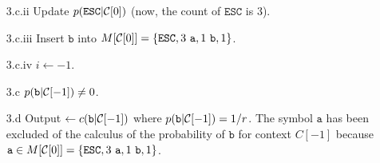 \begin{itemize}
\begin{enumerate}
  \item [3.c.ii] Update $p(\mathtt{ESC}|{\cal C}[0])$ (now, the count of $\mathtt{ESC}$ is $3$).
  \item [3.c.iii] Insert $\mathtt{b}$ into $M[{\cal C}[0]] = \{\mathtt{ESC},3~\mathtt{a},1~\mathtt{b},1\}$.
  \item [3.c.iv] $i\leftarrow -1$.
  \item [3.c] $p(\mathtt{b}|{\cal C}[-1])\neq 0$.
  \item [3.d] Output $\leftarrow c(\mathtt{b}|{\cal C}[-1])$ where $p(\mathtt{b}|{\cal C}[-1]) = 1/r$. The symbol $\mathtt{a}$ has been excluded of the calculus of the probability of $\mathtt{b}$ for context $C[-1]$ because $\mathtt{a}\in M[{\cal C}[0]] = \{\mathtt{ESC},3~ \mathtt{a},1~ \mathtt{b},1\}$.
      \end{enumerate}
\end{itemize}

